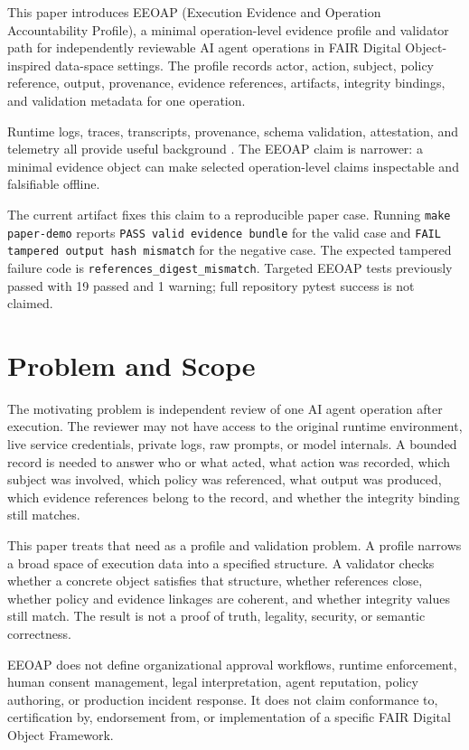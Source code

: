 \documentclass[11pt]{article}
\begin{document}
This paper introduces EEOAP (Execution Evidence and Operation Accountability
Profile), a minimal operation-level evidence profile and validator path for
independently reviewable AI agent operations in FAIR Digital Object-inspired
data-space settings. The profile records actor, action, subject, policy
reference, output, provenance, evidence references, artifacts, integrity
bindings, and validation metadata for one operation.

Runtime logs, traces, transcripts, provenance, schema validation,
attestation, and telemetry all provide useful background \cite{provdm,
provconstraints,jsonschema,slsa,slsaprov,intoto,otel,otelgenai}. The EEOAP
claim is narrower: a minimal evidence object can make selected
operation-level claims inspectable and falsifiable offline.

The current artifact fixes this claim to a reproducible paper case. Running
\texttt{make paper-demo} reports \texttt{PASS valid evidence bundle} for the
valid case and \texttt{FAIL tampered output hash mismatch} for the negative
case. The expected tampered failure code is
\texttt{references\_digest\_mismatch}. Targeted EEOAP tests previously passed
with 19 passed and 1 warning; full repository pytest success is not claimed.

\section{Problem and Scope}

The motivating problem is independent review of one AI agent operation after
execution. The reviewer may not have access to the original runtime
environment, live service credentials, private logs, raw prompts, or model
internals. A bounded record is needed to answer who or what acted, what action
was recorded, which subject was involved, which policy was referenced, what
output was produced, which evidence references belong to the record, and
whether the integrity binding still matches.

This paper treats that need as a profile and validation problem. A profile
narrows a broad space of execution data into a specified structure. A
validator checks whether a concrete object satisfies that structure, whether
references close, whether policy and evidence linkages are coherent, and
whether integrity values still match. The result is not a proof of truth,
legality, security, or semantic correctness.

EEOAP does not define organizational approval workflows, runtime enforcement,
human consent management, legal interpretation, agent reputation, policy
authoring, or production incident response. It does not claim conformance to,
certification by, endorsement from, or implementation of a specific FAIR
Digital Object Framework.
\end{document}
